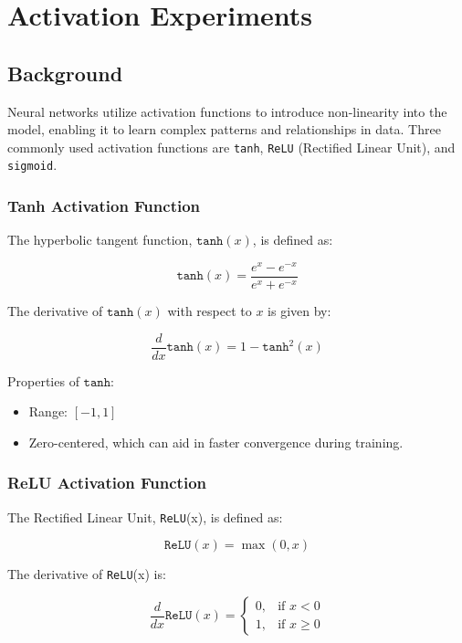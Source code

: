 \section{Activation Experiments}

\subsection{Background}

Neural networks utilize activation functions to introduce non-linearity into the model, enabling it to learn complex patterns and relationships in data. Three commonly used activation functions are \texttt{tanh}, \texttt{ReLU} (Rectified Linear Unit), and \texttt{sigmoid}.

\subsubsection{Tanh Activation Function}

The hyperbolic tangent function, \(\texttt{tanh}(x)\), is defined as:

\[
	\texttt{tanh}(x) = \frac{e^{x} - e^{-x}}{e^{x} + e^{-x}}
\]

The derivative of \(\texttt{tanh}(x)\) with respect to \(x\) is given by:

\[
	\frac{d}{dx} \texttt{tanh}(x) = 1 - \texttt{tanh}^2(x)
\]

Properties of \(\texttt{tanh}\):
\begin{itemize}
	\item Range: \([-1, 1]\)
	\item Zero-centered, which can aid in faster convergence during training.
\end{itemize}

\subsubsection{ReLU Activation Function}

The Rectified Linear Unit, \texttt{ReLU}(x), is defined as:

\[
	\texttt{ReLU}(x) = \max(0, x)
\]

The derivative of \texttt{ReLU}(x) is:

\[
	\frac{d}{dx} \texttt{ReLU}(x) = \begin{cases}
		0, & \text{if } x < 0    \\
		1, & \text{if } x \geq 0
	\end{cases}
\]

